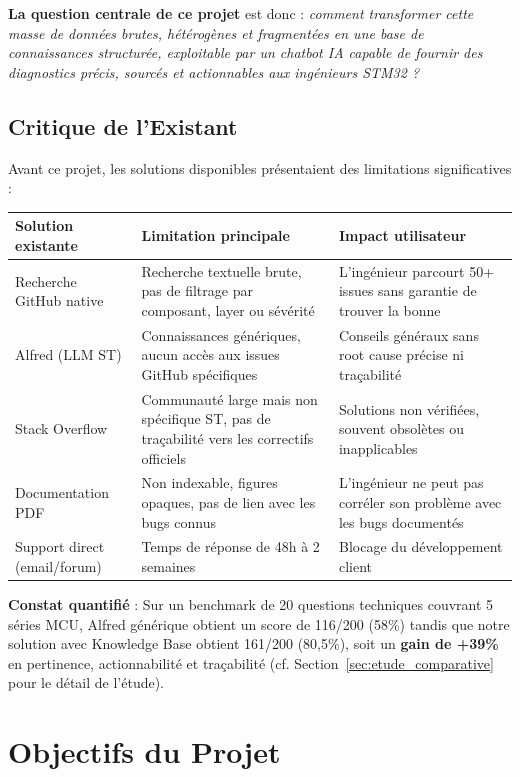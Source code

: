 \documentclass[12pt,a4paper]{report}
\begin{document}
\textbf{La question centrale de ce projet} est donc : \textit{comment transformer cette masse de données brutes, hétérogènes et fragmentées en une base de connaissances structurée, exploitable par un chatbot IA capable de fournir des diagnostics précis, sourcés et actionnables aux ingénieurs STM32 ?}

\subsection{Critique de l'Existant}

Avant ce projet, les solutions disponibles présentaient des limitations significatives :

\begin{longtable}{p{3.5cm}p{5.5cm}p{4.5cm}}
\toprule
\textbf{Solution existante} & \textbf{Limitation principale} & \textbf{Impact utilisateur} \\
\midrule
Recherche GitHub native & Recherche textuelle brute, pas de filtrage par composant, layer ou sévérité & L'ingénieur parcourt 50+ issues sans garantie de trouver la bonne \\
Alfred (LLM ST) & Connaissances génériques, aucun accès aux issues GitHub spécifiques & Conseils généraux sans root cause précise ni traçabilité \\
Stack Overflow & Communauté large mais non spécifique ST, pas de traçabilité vers les correctifs officiels & Solutions non vérifiées, souvent obsolètes ou inapplicables \\
Documentation PDF & Non indexable, figures opaques, pas de lien avec les bugs connus & L'ingénieur ne peut pas corréler son problème avec les bugs documentés \\
Support direct (email/forum) & Temps de réponse de 48h à 2 semaines & Blocage du développement client \\
\bottomrule
\end{longtable}

\textbf{Constat quantifié} : Sur un benchmark de 20 questions techniques couvrant 5 séries MCU, Alfred générique obtient un score de 116/200 (58\%) tandis que notre solution avec Knowledge Base obtient 161/200 (80,5\%), soit un \textbf{gain de +39\%} en pertinence, actionnabilité et traçabilité (cf. Section~\ref{sec:etude_comparative} pour le détail de l'étude).

\section{Objectifs du Projet}
\label{sec:objectifs}
\end{document}
